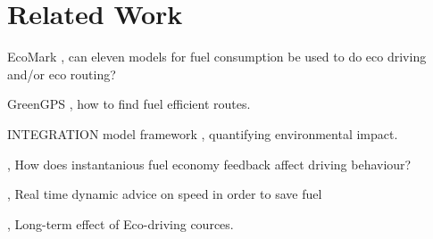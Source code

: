 \section{Related Work}

EcoMark \cite{EcoMark}, can eleven models for fuel consumption be used to do eco driving and/or eco routing?

GreenGPS \cite{GreenGPS}, how to find fuel efficient routes.

INTEGRATION model framework \cite{IMF}, quantifying environmental impact.

\cite{EvalEcoDriving}, How does instantanious fuel economy feedback affect driving behaviour?

\cite{Barth}, Real time dynamic advice on speed in order to save fuel 

\cite{Beusen}, Long-term effect of Eco-driving cources.